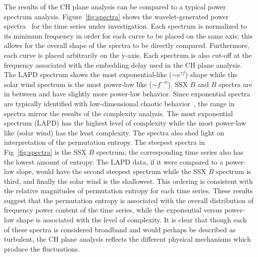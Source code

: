 \documentclass[aps,prx,twocolumn,secnumarabic,nobalancelastpage,amsmath,amssymb,
nofootinbib]{revtex4-1}
\begin{document}
The results of the CH plane analysis can be compared to a typical power spectrum analysis. Figure~\ref{fig:spectra} shows the wavelet-generated power spectra~\cite{torrence1998} for the time series under investigation. Each spectrum is normalized to its minimum frequency in order for each curve to be placed on the same axis; this allows for the overall shape of the spectra to be directly compared. Furthermore, each curve is placed arbitrarily on the y-axis. Each spectrum is also cut-off at the frequency associated with the embedding delay used in the CH plane analysis. The LAPD spectrum shows the most exponential-like ($\sim e^{\tau f}$) shape while the solar wind spectrum is the most power-law like ($\sim f^{-\alpha}$). SSX $\dot{B}$ and $B$ spectra are in between and have slightly more power-law behavior. Since exponential spectra are typically identified with low-dimensional chaotic behavior~\cite{maggs2012}, the range in spectra mirror the results of the complexity analysis. The most exponential spectrum (LAPD) has the highest level of complexity while the most power-law like (solar wind) has the least complexity. The spectra also shed light on interpretation of the permutation entropy. The steepest spectra in Fig~\ref{fig:spectra} is the SSX $B$ spectrum; the corresponding time series also has the lowest amount of entropy. The LAPD data, if it were compared to a power-law slope, would have the second steepest spectrum while the SSX $\dot{B}$ spectrum is third, and finally the solar wind is the shallowest. This ordering is consistent with the relative magnitudes of permutation entropy for each time series. These results suggest that the permutation entropy is associated with the overall distribution of frequency power content of the time series, while the exponential versus power-law shape is associated with the level of complexity. It is clear that though each of these spectra is considered broadband and would perhaps be described as turbulent, the CH plane analysis reflects the different physical mechanisms which produce the fluctuations.
\end{document}
